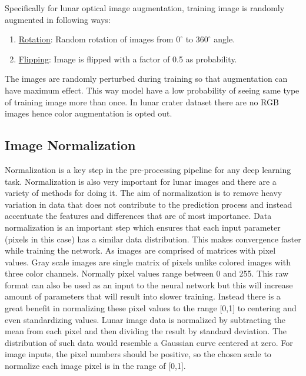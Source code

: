 \documentclass[11pt]{article}
\begin{document}
Specifically for lunar optical image augmentation, training image is randomly augmented in following ways:

\begin{enumerate}
	\item \underline{Rotation}: Random rotation of images from $0^{\circ}$ to $360^{\circ}$ angle.
	\item \underline{Flipping}: Image is flipped with a factor of 0.5 as probability. 
\end{enumerate}

The images are randomly perturbed during training so that augmentation can have maximum effect. This way model have a low probability of seeing same type of training image more than once. In lunar crater dataset there are no RGB images hence color augmentation is opted out.

\subsection{Image Normalization}
Normalization is a key step in the pre-processing pipeline for any deep learning task. Normalization is also very important for lunar images and there are a variety of methods for doing it. The aim of normalization is to remove heavy variation in data that does not contribute to the prediction process and instead accentuate the features and differences that
are of most importance. Data normalization is an important step which ensures that each input parameter (pixels in this case) has a similar data distribution. This makes convergence faster while training the network. As images are comprised of matrices with pixel values. Gray scale images are single matrix of pixels unlike colored images with three color channels. Normally pixel values range between 0 and 255. This raw format can also be used as an input to the neural network but this will increase amount of parameters that will result into slower training. Instead there is a great benefit in normalizing these pixel values to the range [0,1] to centering and even standardizing values. Lunar image data is normalized by subtracting the mean from each pixel and then dividing the result by standard deviation. The distribution of such data would resemble a Gaussian curve centered at zero. For image inputs, the pixel numbers should be positive, so the chosen scale to normalize each image pixel is in the range of [0,1]. 
\end{document}
